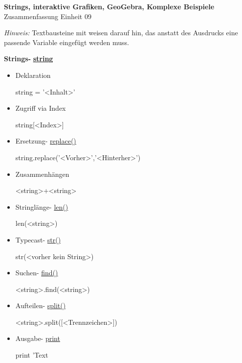 \documentclass[a4paper,9pt,DIV15,twocolumn]{scrartcl}
\begin{document}
\begin{center}
    \textbf{\LARGE Strings, interaktive Grafiken, GeoGebra, Komplexe Beispiele}\\
    {\large Zusammenfassung Einheit 09}
\end{center}
\textsl{Hinweis:} Textbausteine mit  weisen darauf hin, das anstatt des Ausdrucks eine passende Variable eingefügt werden muss.

\medskip

\textbf{Strings- }\href{http://docs.python.org/library/string.html?highlight=string.replace#string-constants}{\textbf{string}}

\begin{itemize}
 \item Deklaration
\begin{sagein}
string = '<Inhalt>'
\end{sagein}
\item Zugriff via Index
\begin{sagein}
string[<Index>]
\end{sagein}
\item Ersetzung- \href{http://docs.python.org/library/string.html?highlight=string.replace#string.replace}{replace()}
\begin{sagein}
string.replace('<Vorher>','<Hinterher>')
\end{sagein}
\item Zusammenhängen
\begin{sagein}
 <string>+<string>
\end{sagein}
\item Stringlänge- \href{http://docs.python.org/library/functions.html?highlight=print#len}{len()}
\begin{sagein}
 len(<string>)
\end{sagein}
\item Typecast- \href{http://docs.python.org/library/functions.html?highlight=print#str}{str()}
\begin{sagein}
str(<vorher kein String>)
\end{sagein}
\item Suchen- \href{http://docs.python.org/library/string.html?highlight=string.replace#string.find}{find()}
\begin{sagein}
 <string>.find(<string>)
\end{sagein}
\item Aufteilen- \href{http://docs.python.org/library/string.html?highlight=string.replace#string.split}{split()}
\begin{sagein}
 <string>.split([<Trennzeichen>])
\end{sagein}
\item Ausgabe- \href{http://docs.python.org/library/functions.html?highlight=print#print}{print}
\begin{sagein}
  print 'Text %
 \end{sagein}
\end{itemize}
\end{document}
